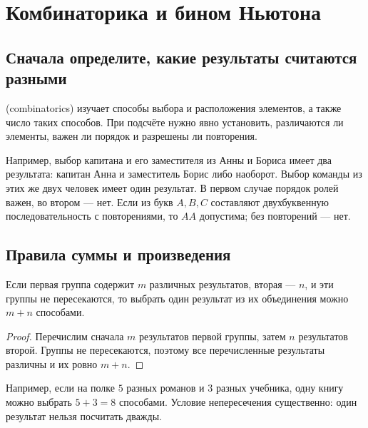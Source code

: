 \chapter{Комбинаторика и бином Ньютона}\label{chap:c10}
\section{Сначала определите, какие результаты считаются разными}

\begin{definition}
 (combinatorics) изучает способы выбора и расположения элементов,
а также число таких способов. При подсчёте нужно явно установить,
различаются ли элементы, важен ли порядок и разрешены ли повторения.
\end{definition}

Например, выбор капитана и его заместителя из Анны и Бориса имеет два результата:
капитан Анна и заместитель Борис либо наоборот.
Выбор команды из этих же двух человек имеет один результат.
В первом случае порядок ролей важен, во втором --- нет.
Если из букв \(A,B,C\) составляют двухбуквенную последовательность с повторениями,
то \(AA\) допустима; без повторений --- нет.

\section{Правила суммы и произведения}

\begin{theorem}\label{thm:legacy-c10-1}
Если первая группа содержит \(m\) различных результатов, вторая --- \(n\),
и эти группы не пересекаются, то выбрать один результат
из их объединения можно \(m+n\) способами.
\end{theorem}
\begin{proof}Перечислим сначала \(m\) результатов первой группы, затем \(n\) результатов второй. Группы не пересекаются, поэтому все перечисленные результаты различны и их ровно \(m+n\).\end{proof}

Например, если на полке \(5\) разных романов и \(3\) разных учебника,
одну книгу можно выбрать \(5+3=8\) способами.
Условие непересечения существенно: один результат нельзя посчитать дважды.

